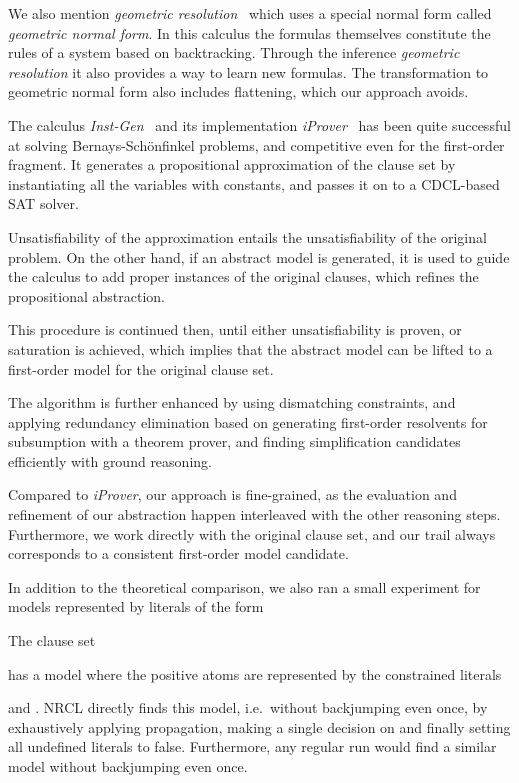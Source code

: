 \documentclass[a4paper]{article}
\newcommand{\mEPR}{Bernays-Sch\"onfinkel}
\newcommand{\ie}{i.e.\ }
\begin{document}
{We also mention \emph{geometric resolution}~\cite{GeoRes06} which uses a special normal form called \emph{geometric normal form}. In this calculus the formulas
themselves constitute the rules of a system based on backtracking. 
Through the inference \emph{geometric resolution} it also provides a way to learn new formulas.
The transformation to geometric normal form also includes flattening, 
which our approach avoids.

The calculus \emph{Inst-Gen}~\cite{InstGen03} and its implementation \emph{iProver}~\cite{iProver08} 
has been quite successful at solving {\mEPR} problems, and competitive even for the first-order fragment.
It generates a propositional approximation of the clause set by instantiating all the variables with constants, 
and passes it on to a CDCL-based SAT solver. 

Unsatisfiability of the approximation entails the unsatisfiability of the original problem.
On the other hand, if an abstract model is generated, it is used to guide the calculus to add 
proper instances of the original clauses, which refines the propositional abstraction.

This procedure is continued then, until either unsatisfiability is proven, or saturation is achieved, 
which implies that the abstract model can be lifted to a first-order model for the original clause set.

The algorithm is further enhanced by using dismatching constraints, and applying redundancy elimination based 
on generating first-order resolvents for subsumption with a theorem prover, and finding simplification candidates efficiently
with ground reasoning.

Compared to \emph{iProver}, our approach is fine-grained, 
as the evaluation and refinement of our abstraction happen interleaved with the other reasoning steps.
Furthermore, we work directly with the original clause set, and our trail always corresponds 
to a consistent first-order model candidate.

In addition to the theoretical comparison, we also ran a small experiment for models represented by literals of the form 

The clause set

  
	
  
	
  \newline
has a model where the positive atoms are represented by the constrained literals 

and . NRCL directly finds this model, \ie without backjumping even once, 
by exhaustively applying propagation, making a single decision on  and finally 
setting all undefined  literals to false. Furthermore, any regular run would find a similar model without 
backjumping even once.

}
\end{document}
